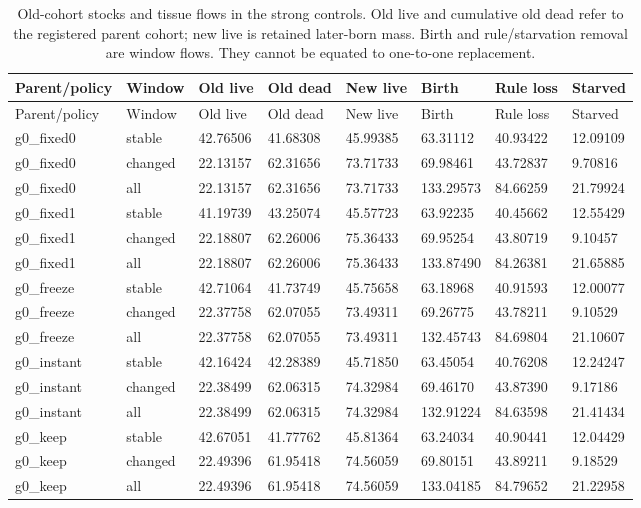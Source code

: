\begin{longtable}{llllllll}
\caption{Old-cohort stocks and tissue flows in the strong controls. Old live and cumulative old dead refer to the registered parent cohort; new live is retained later-born mass. Birth and rule/starvation removal are window flows. They cannot be equated to one-to-one replacement.}\label{tab:maintenance-cohorts}\\
\toprule
Parent/policy & Window & Old live & Old dead & New live & Birth & Rule loss & Starved \\
\midrule
\endfirsthead
\toprule
Parent/policy & Window & Old live & Old dead & New live & Birth & Rule loss & Starved \\
\midrule
\endhead
g0\_fixed0 & stable & 42.76506 & 41.68308 & 45.99385 & 63.31112 & 40.93422 & 12.09109 \\
g0\_fixed0 & changed & 22.13157 & 62.31656 & 73.71733 & 69.98461 & 43.72837 & 9.70816 \\
g0\_fixed0 & all & 22.13157 & 62.31656 & 73.71733 & 133.29573 & 84.66259 & 21.79924 \\
g0\_fixed1 & stable & 41.19739 & 43.25074 & 45.57723 & 63.92235 & 40.45662 & 12.55429 \\
g0\_fixed1 & changed & 22.18807 & 62.26006 & 75.36433 & 69.95254 & 43.80719 & 9.10457 \\
g0\_fixed1 & all & 22.18807 & 62.26006 & 75.36433 & 133.87490 & 84.26381 & 21.65885 \\
g0\_freeze & stable & 42.71064 & 41.73749 & 45.75658 & 63.18968 & 40.91593 & 12.00077 \\
g0\_freeze & changed & 22.37758 & 62.07055 & 73.49311 & 69.26775 & 43.78211 & 9.10529 \\
g0\_freeze & all & 22.37758 & 62.07055 & 73.49311 & 132.45743 & 84.69804 & 21.10607 \\
g0\_instant & stable & 42.16424 & 42.28389 & 45.71850 & 63.45054 & 40.76208 & 12.24247 \\
g0\_instant & changed & 22.38499 & 62.06315 & 74.32984 & 69.46170 & 43.87390 & 9.17186 \\
g0\_instant & all & 22.38499 & 62.06315 & 74.32984 & 132.91224 & 84.63598 & 21.41434 \\
g0\_keep & stable & 42.67051 & 41.77762 & 45.81364 & 63.24034 & 40.90441 & 12.04429 \\
g0\_keep & changed & 22.49396 & 61.95418 & 74.56059 & 69.80151 & 43.89211 & 9.18529 \\
g0\_keep & all & 22.49396 & 61.95418 & 74.56059 & 133.04185 & 84.79652 & 21.22958 \\

\end{longtable}

